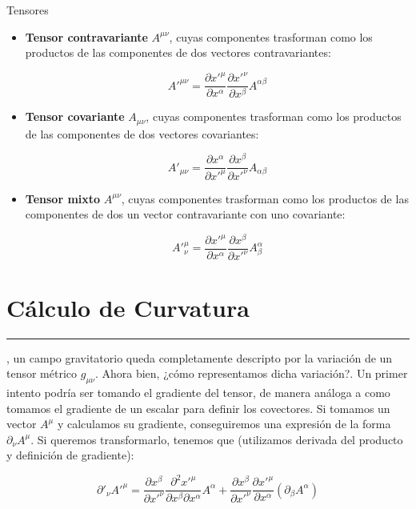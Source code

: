 \begin{remarkbox}{Tensores}
\begin{itemize}
    \item \textbf{Tensor contravariante} $A^{\mu\nu}$, cuyas componentes trasforman como los productos de las componentes de dos vectores contravariantes:
    
    $$A'^{\mu\nu}=\frac{\partial x'^\mu}{\partial x^\alpha}\frac{\partial x'^\nu}{\partial x^\beta}A^{\alpha \beta}$$
    
    \item \textbf{Tensor covariante} $A_{\mu\nu}$, cuyas componentes trasforman como los productos de las componentes de dos vectores covariantes:
    
    $$A'_{\mu\nu}=\frac{\partial x^\alpha}{\partial x'^\mu}\frac{\partial x^\beta}{\partial x'^\nu}A_{\alpha \beta}$$
    
    \item \textbf{Tensor mixto} $A^{\mu\nu}$, cuyas componentes trasforman como los productos de las componentes de dos un vector contravariante con uno covariante:
    
    $$A'^{\mu}_\nu=\frac{\partial x'^\mu}{\partial x^\alpha}\frac{\partial x^\beta}{\partial x'^\nu}A^{\alpha}_{\beta}$$
\end{itemize}
\end{remarkbox}

\newpage

\section{\huge{Cálculo de Curvatura}}
\textcolor{myred}{\hrule}

, un campo gravitatorio queda completamente descripto por la variación de un tensor métrico $g_{\mu\nu}$. Ahora bien, ¿cómo representamos dicha variación?. Un primer intento podría ser tomando el gradiente del tensor, de manera análoga a como tomamos el gradiente de un escalar para definir los covectores. Si tomamos un vector $A^\mu$ y calculamos su gradiente, conseguiremos una expresión de la forma $\partial_{\nu}A^{\mu}$. Si queremos transformarlo, tenemos que (utilizamos derivada del producto y definición de gradiente):

\begin{equation}
    \partial'_{\nu}A'^{\mu}=\frac{\partial x^{\beta}}{\partial x'^{\nu}}\frac{\partial^2 x'^\mu}{\partial x^\beta \partial x^\alpha}A^{\alpha}+\frac{\partial x^\beta}{\partial x'^\nu}\frac{\partial x'^{\mu}}{\partial x^{\alpha}}(\partial_\beta A^{\alpha})
\end{equation}

